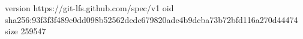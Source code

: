 version https://git-lfs.github.com/spec/v1
oid sha256:93f3f3f489c0dd098b52562dedc679820ade4b9dcba73b72bfd116a270d44474
size 259547
